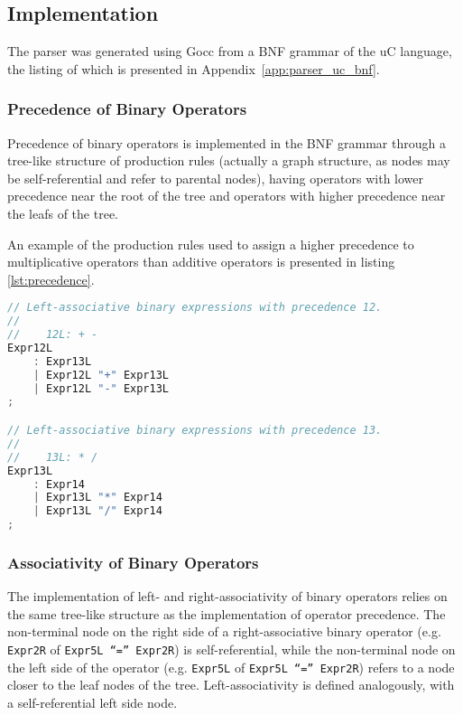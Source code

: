 \subsection{Implementation}

The parser was generated using Gocc from a BNF grammar of the uC language, the listing of which is presented in Appendix~\ref{app:parser_uc_bnf}.



\subsubsection{Precedence of Binary Operators}

Precedence of binary operators is implemented in the BNF grammar through a tree-like structure of production rules (actually a graph structure, as nodes may be self-referential and refer to parental nodes), having operators with lower precedence near the root of the tree and operators with higher precedence near the leafs of the tree.

An example of the production rules used to assign a higher precedence to multiplicative operators than additive operators is presented in listing \ref{lst:precedence}.

\begin{lstlisting}[language=go,style=go,caption={\label{lst:precedence}Precedence of binary expressions.}]
// Left-associative binary expressions with precedence 12.
//
//    12L: + -
Expr12L
	: Expr13L
	| Expr12L "+" Expr13L
	| Expr12L "-" Expr13L
;

// Left-associative binary expressions with precedence 13.
//
//    13L: * /
Expr13L
	: Expr14
	| Expr13L "*" Expr14
	| Expr13L "/" Expr14
;
\end{lstlisting}

\subsubsection{Associativity of Binary Operators}

The implementation of left- and right-associativity of binary operators relies on the same tree-like structure as the implementation of operator precedence. The non-terminal node on the right side of a right-associative binary operator (e.g. \texttt{Expr2R} of \texttt{Expr5L ``='' Expr2R}) is self-referential, while the non-terminal node on the left side of the operator (e.g. \texttt{Expr5L} of \texttt{Expr5L ``='' Expr2R}) refers to a node closer to the leaf nodes of the tree. Left-associativity is defined analogously, with a self-referential left side node.

